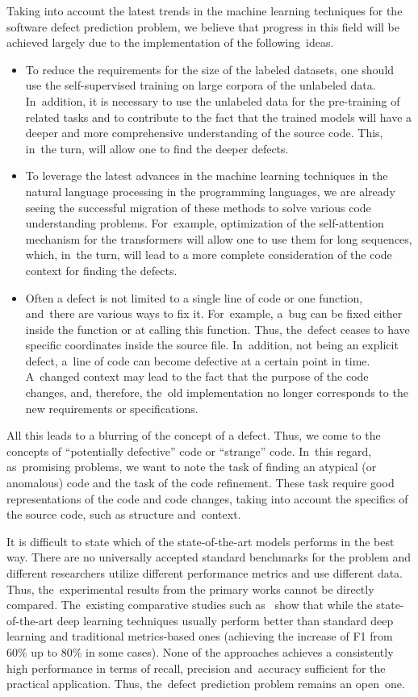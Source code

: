 \documentclass[mathematics,review,accept,moreauthors,pdftex]{Definitions/mdpi}
\begin{document}
\begin{paracol}{2}
Taking into account the latest trends in the machine learning techniques for the software defect prediction problem, we believe that progress in this field will be achieved largely due to the implementation of the following~ideas.
\begin{itemize}
\item To reduce the requirements for the size of the labeled datasets, one should use the self-supervised training on large corpora of the unlabeled data. In~addition, it is necessary to use the unlabeled data for the pre-training of related tasks and to contribute to the fact that the trained models will have a deeper and more comprehensive understanding of the source code. This, in~the turn, will allow one to find the deeper defects.
\item To leverage the latest advances in the machine learning techniques in the natural language processing in the programming languages, we are already seeing the successful migration of these methods to solve various code understanding problems. For~example, optimization of the self-attention mechanism for the transformers will allow one to use them for long sequences, which, in~the turn, will lead to a more complete consideration of the code context for finding the defects.
\item Often a defect is not limited to a single line of code or one function, and~there are various ways to fix it. For~example, a~bug can be fixed either inside the function or at calling this function. Thus, the~defect ceases to have specific coordinates inside the source file. In~addition, not being an explicit defect, a~line of code can become defective at a certain point in time. A~changed context may lead to the fact that the purpose of the code changes, and, therefore, the~old implementation no longer corresponds to the new requirements or specifications. 
\end{itemize}

All this leads to a blurring of the concept of a defect. Thus, we come to the concepts of ``potentially defective'' code or ``strange'' code. In~this regard, as~promising problems, we want to note the task of finding an atypical (or anomalous) code and the task of the code refinement. These task require good representations of the code and code changes, taking into account the specifics of the source code, such as structure and~context.

It is difficult to state which of the state-of-the-art models performs in the best way. There are no universally accepted standard benchmarks for the problem and different researchers utilize different performance metrics and use different data. Thus, the~experimental results from the primary works cannot be directly compared. The~existing comparative studies such as~\cite{Herbold2018benchmark} show that while the state-of-the-art deep learning techniques usually perform better than standard deep learning and traditional metrics-based ones (achieving the increase of F1 from 60\% up to 80\% in some cases). None of the approaches achieves a consistently high performance in terms of recall, precision and~accuracy sufficient for the practical application. Thus, the~defect prediction problem remains an open~one.


\end{paracol}
\end{document}
